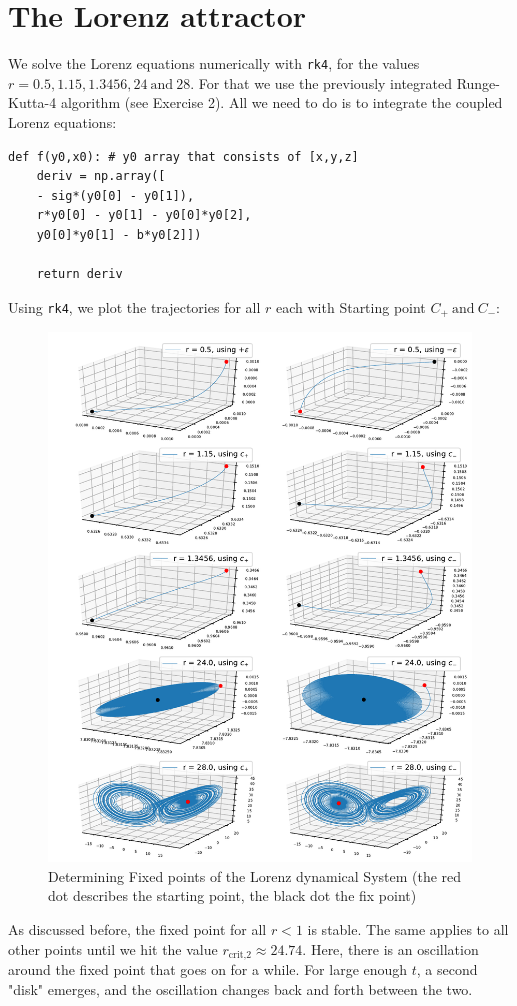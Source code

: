\documentclass{article}
\begin{document}
\section{The Lorenz attractor}
We solve the Lorenz equations numerically with \texttt{rk4}, for the values
\( r = 0.5, 1.15, 1.3456, 24 \ \text{and} \ 28 \).
For that we use the previously integrated Runge-Kutta-4 algorithm
(see Exercise 2). All we need to do is to integrate the coupled Lorenz equations:
\begin{lstlisting}
def f(y0,x0): # y0 array that consists of [x,y,z]
    deriv = np.array([
    - sig*(y0[0] - y0[1]),
    r*y0[0] - y0[1] - y0[0]*y0[2],
    y0[0]*y0[1] - b*y0[2]])

    return deriv
\end{lstlisting}
Using \texttt{rk4}, we plot the trajectories for all \( r \) each with Starting
point \( C_+ \ \text{and} \ C_- \):
\begin{figure}[H]
    \centering
    \includegraphics[width=.95\textwidth]{Figure2-1.pdf} 
    \caption{Determining Fixed points of the Lorenz dynamical System
    (the red dot describes the starting point, the black dot the fix point)} 
    \label{2-1}
\end{figure}
As discussed before, the fixed point for all $r < 1$ is stable. The
same applies to all other points until we hit the value \( r_\text{crit,2}
    \approx 24.74\). Here, there is an oscillation around the fixed point that
goes on for a while. For large enough \( t \), a second "disk" emerges, and the
oscillation changes back and forth between the two.\\[.5cm]
\end{document}
